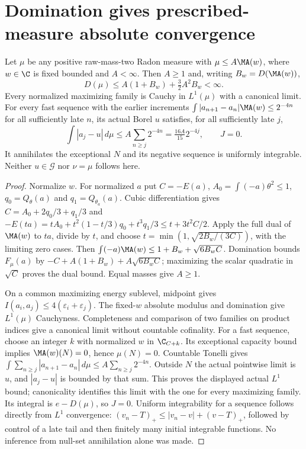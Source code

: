 \section{Domination gives prescribed-measure absolute convergence}
\begin{theorem}\label{newns:domination}
Let $\mu$ be any positive raw-mass-two Radon measure with
$\mu\le A\MA(w)$, where $w\in\C$ is fixed bounded and $A<\infty$.
Then $A\ge1$ and, writing $B_w=D(\MA(w))$,
\[
 D(\mu)\le A(1+B_w)+\tfrac32A^2B_w<\infty.
\]
Every normalized maximizing family is Cauchy in $L^1(\mu)$ with a
canonical limit. For every fast sequence with the earlier increments
$\int|a_{n+1}-a_n|\MA(w)\le2^{-4n}$ for all sufficiently late $n$,
its actual Borel $u$ satisfies, for all sufficiently late $j$,
\[
 \int|a_j-u|\,d\mu\le A\sum_{n\ge j}2^{-4n}
 =\tfrac{16A}{15}2^{-4j},\qquad J=0.
\]
It annihilates the exceptional $N$ and its negative sequence is uniformly
integrable. Neither $u\in\mathcal G$ nor $\nu=\mu$ follows here.
\end{theorem}
\begin{proof}
Normalize $w$. For normalized $a$ put $C=-E(a)$,
$A_0=\int(-a)\theta^2\le1$, $q_0=Q_\theta(a)$ and
$q_1=Q_{\theta_a}(a)$. Cubic differentiation gives
$C=A_0+2q_0/3+q_1/3$ and
$-E(ta)=tA_0+t^2(1-t/3)q_0+t^3q_1/3\le t+3t^2C/2$.
Apply the full dual of $\MA(w)$ to $ta$, divide by $t$, and choose
$t=\min(1,\sqrt{2B_w/(3C)})$, with the limiting zero cases.
Then $\int(-a)\MA(w)\le1+B_w+\sqrt{6B_wC}$.
Domination bounds $F_\mu(a)$ by
$-C+A(1+B_w)+A\sqrt{6B_wC}$; maximizing the scalar quadratic
in $\sqrt C$ proves the dual bound. Equal masses give $A\ge1$.

On a common maximizing energy sublevel, midpoint gives
$I(a_i,a_j)\le4(\varepsilon_i+\varepsilon_j)$.
The fixed-$w$ absolute modulus and domination give $L^1(\mu)$
Cauchyness. Completeness and comparison of two families on product
indices give a canonical limit without countable cofinality.
For a fast sequence, choose an integer $k$ with normalized $w$ in
$\C_{C+k}$. Its exceptional capacity bound implies
$\MA(w)(N)=0$, hence $\mu(N)=0$.
Countable Tonelli gives
$\int\sum_{n\ge j}|a_{n+1}-a_n|\,d\mu\le A\sum_{n\ge j}2^{-4n}$.
Outside $N$ the actual pointwise limit is $u$, and
$|a_j-u|$ is bounded by that sum. This proves the displayed actual
$L^1$ bound; canonicality identifies this limit with the one for every
maximizing family. Its integral is $e-D(\mu)$, so $J=0$.
Uniform integrability for a sequence follows directly from $L^1$
convergence: $(v_n-T)_+\le|v_n-v|+(v-T)_+$, followed by control
of a late tail and then finitely many initial integrable functions.
No inference from null-set annihilation alone was made.
\end{proof}

